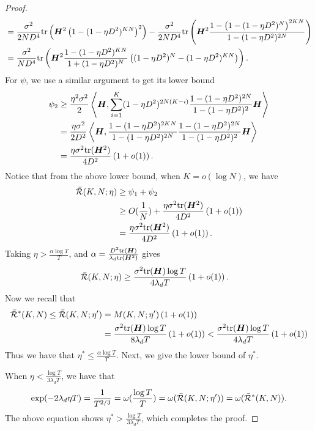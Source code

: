 \begin{proof}
\begin{align*}
    &= \frac{\sigma^2}{2ND^4}\mathrm{tr}\left({\bm{H}}^2 \left(1 - (1 -\eta D^2)^{KN}\right)^2 \right) - \frac{\sigma^2}{2ND^4}\mathrm{tr}\left({\bm{H}}^2 \frac{1- \left(1 - (1 -\eta D^2)^N\right)^{2KN} }{1 - (1-\eta D^2)^{2N}}\right)\\
    &=\frac{\sigma^2}{ND^4}\mathrm{tr}\left({\bm{H}}^2 \frac{1- (1-\eta D^2)^{KN}}{1+ (1-\eta D^2)^{N}} \left( (1-\eta D^2)^{N} -  (1-\eta D^2)^{KN}\right)\right).
\end{align*}
For $\psi$, we use a similar argument to get its lower bound
\begin{align*}
    \psi_2 &\ge \frac{\eta^2\sigma^2}{2}\left\langle {\bm{H}},\sum_{i=1}^K (1-\eta D^2)^{2N(K-i)} \frac{1- (1-\eta D^2)^{2N}}{1-(1-\eta D^2)^{2}}{\bm{H}}\right\rangle\\
    &=\frac{\eta\sigma^2}{2D^2}\left\langle {\bm{H}}, \frac{1-  (1-\eta D^2)^{2KN}}{1- (1-\eta D^2)^{2N}}\frac{1- (1-\eta D^2)^{2N}}{1-(1-\eta D^2)^{2}}{\bm{H}}\right\rangle\\
    &=\frac{\eta\sigma^2\mathrm{tr}({\bm{H}}^2)}{4D^2}\left(1 +o(1)\right).
\end{align*}
Notice that from the above lower bound, when $K = o(\log N)$, we have
\begin{align}
    \bar{\mathcal{R}}(K,N;\eta) &\ge \psi_1 + \psi_2\notag\\
    &\ge O(\frac{1}{N}) + \frac{\eta\sigma^2\mathrm{tr}({\bm{H}}^2)}{4D^2}\left(1 +o(1)\right)\notag\\
    &= \frac{\eta\sigma^2\mathrm{tr}({\bm{H}}^2)}{4D^2}\left(1 +o(1)\right). \label{ineq:var-lower-bound}
\end{align}
Taking $\eta > \frac{\alpha \log T}{T}$, and $\alpha = \frac{D^2 \mathrm{tr}({\bm{H}})}{\lambda_d \mathrm{tr}({\bm{H}}^2)}$ 
gives 
\begin{align*}
    \bar{\mathcal{R}}(K,N;\eta) &\ge \frac{\sigma^2 \mathrm{tr}({\bm{H}})\log T}{4\lambda_d T}\left(1 + o(1)\right).
\end{align*}
Now we recall that 
\begin{align*}
    \bar{\mathcal{R}}^*(K,N) \le \bar{\mathcal{R}}(K,N;\eta') &= M(K,N;\eta')\left(1 + o(1)\right)\\
     &=\frac{\sigma^2 \mathrm{tr}({\bm{H}})\log T}{8\lambda_d T}\left(1 + o(1)\right) < \frac{\sigma^2 \mathrm{tr}({\bm{H}})\log T}{4\lambda_d T}\left(1 + o(1)\right)
\end{align*}
Thus we have that $\eta^* \le \frac{\alpha \log T}{T}$. Next, we give the lower bound of $\eta^*$.

When $\eta < \frac{\log T}{3 \lambda_d T}$, we have that
\begin{align*}
    \exp(-2\lambda_d\eta T) = \frac{1}{T^{2/3}} = \omega(\frac{\log T}{T}) = \omega( \bar{\mathcal{R}}(K,N;\eta')) = \omega(\bar{\mathcal{R}}^*(K,N)).
\end{align*}
The above equation shows $\eta^* > \frac{\log T}{3 \lambda_d T}$, which completes the proof.
\end{proof}

